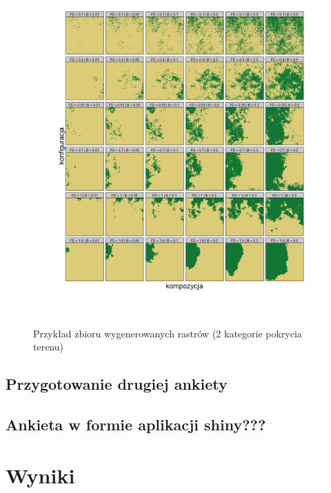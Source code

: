 \documentclass{amuthesis}
\begin{document}
\begin{figure}[t]

{\centering \includegraphics[width=1\textwidth,height=5.20833in]{figures/wykres1_2classes.png}

}

\caption{\label{fig-wykres1_2classes}Przykład zbioru wygenerowanych
rastrów (2 kategorie pokrycia terenu)}

\end{figure}

\hypertarget{sec-przygotowanie2}{%
\section{Przygotowanie drugiej ankiety}\label{sec-przygotowanie2}}

\hypertarget{sec-app}{%
\section{Ankieta w formie aplikacji shiny???}\label{sec-app}}


\hypertarget{sec-wyniki}{%
\chapter{Wyniki}\label{sec-wyniki}}
\end{document}

